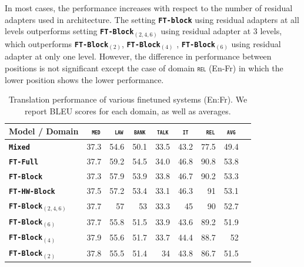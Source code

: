 \documentclass[11pt,a4paper]{article}
\newcommand{\fyTodo}[1]{\Todo[FY:]{\textcolor{orange}{#1}}}
\newcommand{\domain}[1]{\texttt{\textsc{#1}}}
\newcommand{\system}[1]{\texttt{\textbf{#1}}}
\begin{document}
 In most cases, the performance increases with respect to the number of residual adapters used in architecture. The setting \system{FT-block} using residual adapters at all levels outperforms setting \system{FT-Block$_{(2,4,6)}$} using residual adapter at 3 levels, which outperforms \system{FT-Block$_{(2)}$}, \system{FT-Block$_{(4)}$} , \system{FT-Block$_{(6)}$} using residual adapter at only one level. However, the difference in performance between positions is not significant except the case of domain \domain{rel} (En-Fr) in which the lower position shows the lower performance.\fyTodo{What does bold mean ?}\fyTodo{Number of parameters ?} 

\begin{table}
  \centering
  \begin{tabular}{|p{3cm}|*{8}{r|}} \hline
    Model / Domain & \multicolumn{1}{c|}{\domain{ med}} & \multicolumn{1}{c|}{\domain{ law}} & \multicolumn{1}{c|}{\domain{bank}} & \multicolumn{1}{c|}{\domain{talk}} & \multicolumn{1}{c|}{\domain{ it }} & \multicolumn{1}{c|}{\domain{ rel}} & \multicolumn{1}{c|}{\domain{avg}} \\ \hline %
    \system{Mixed}  & 37.3 & 54.6 & 50.1 & 33.5 & 43.2 & 77.5  & 49.4 \\
    \system{FT-Full}       & 37.7 & 59.2 & 54.5 & 34.0 & 46.8 & 90.8 & 53.8 \\
    \system{FT-Block}     & 37.3 & 57.9 & 53.9 & 33.8 & 46.7 & 90.2 & 53.3 \\ 
    \system{FT-HW-Block}   & 37.5 & 57.2 & 53.4 & 33.1 & 46.3 & 91 & 53.1 \\ 
    \system{FT-Block$_{(2,4,6)}$}     & 37.7 & 57 & 53 & 33.3 & 45 & 90 & 52.7 \\
    \system{FT-Block$_{(6)}$}     & 37.7 & 55.8 & 51.5 & 33.9 & 43.6 & 89.2 & 51.9 \\
    \system{FT-Block$_{(4)}$}     & 37.9 & 55.6 & 51.7 & 33.7 & 44.4 & 88.7 & 52 \\
   \system{FT-Block$_{(2)}$}     & 37.8 & 55.5 & 51.4 & 34 & 43.8 & 86.7 & 51.5 \\
     \hline
  \end{tabular}
  \caption{Translation performance of various finetuned systems (En:Fr). We report BLEU scores for each domain, as well as averages.}\fyTodo{Boldface ?}
  \label{tab:performance-en-fr}
\end{table}
\end{document}
